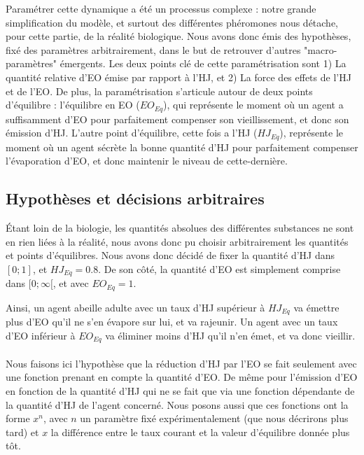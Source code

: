 	Paramétrer cette dynamique a été un processus complexe : notre grande simplification du modèle, et surtout des différentes phéromones nous détache, pour cette partie, de la réalité biologique. Nous avons donc émis des hypothèses, fixé des paramètres arbitrairement, dans le but de retrouver d'autres "macro-paramètres" émergents. Les deux points clé de cette paramétrisation sont 1) La quantité relative d'EO émise par rapport à l'HJ, et 2) La force des effets de l'HJ et de l'EO. De plus, la paramétrisation s'articule autour de deux points d'équilibre : l'équilibre en EO ($EO_{Eq}$), qui représente le moment où un agent a suffisamment d'EO pour parfaitement compenser son vieillissement, et donc son émission d'HJ. L'autre point d'équilibre, cette fois a l'HJ ($HJ_{Eq}$), représente le moment où un agent sécrète la bonne quantité d'HJ pour parfaitement compenser l'évaporation d'EO, et donc maintenir le niveau de cette-dernière.
	
	\subsection{Hypothèses et décisions arbitraires}
	Étant loin de la biologie, les quantités absolues des différentes substances ne sont en rien liées à la réalité, nous avons donc pu choisir arbitrairement les quantités et points d'équilibres. Nous avons donc décidé de fixer la quantité d'HJ dans $[0;1]$, et $HJ_{Eq} = 0.8$. De son côté, la quantité d'EO est simplement comprise dans $[0;\infty[$, et avec $EO_{Eq} = 1$. 
	
	Ainsi, un agent abeille adulte avec un taux d'HJ supérieur à $HJ_{Eq}$ va émettre plus d'EO qu'il ne s'en évapore sur lui, et va rajeunir. Un agent avec un taux d'EO inférieur à $EO_{Eq}$ va éliminer moins d'HJ qu'il n'en émet, et va donc vieillir.
	
	\paragraph{}
	Nous faisons ici l'hypothèse que la réduction d'HJ par l'EO se fait seulement avec une fonction prenant en compte la quantité d'EO. De même pour l'émission d'EO en fonction de la quantité d'HJ qui ne se fait que via une fonction dépendante de la quantité d'HJ de l'agent concerné. Nous posons aussi que ces fonctions ont la forme $x^n$, avec $n$ un paramètre fixé expérimentalement (que nous décrirons plus tard) et $x$ la différence entre le taux courant et la valeur d'équilibre donnée plus tôt.
	
